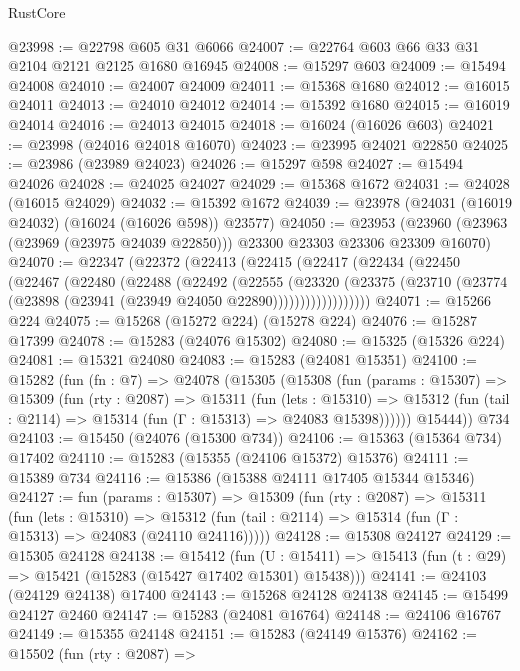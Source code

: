 \begin{lexlean}{RustCore}
\begin{coremodule}
@23998 := @22798 @605 @31 @6066
@24007 := @22764 @603 @66 @33 @31 @2104 @2121 @2125 @1680 @16945
@24008 := @15297 @603
@24009 := @15494 @24008
@24010 := @24007 @24009
@24011 := @15368 @1680
@24012 := @16015 @24011
@24013 := @24010 @24012
@24014 := @15392 @1680
@24015 := @16019 @24014
@24016 := @24013 @24015
@24018 := @16024 (@16026 @603)
@24021 := @23998 (@24016 @24018 @16070)
@24023 := @23995 @24021 @22850
@24025 := @23986 (@23989 @24023)
@24026 := @15297 @598
@24027 := @15494 @24026
@24028 := @24025 @24027
@24029 := @15368 @1672
@24031 := @24028 (@16015 @24029)
@24032 := @15392 @1672
@24039 := @23978 (@24031 (@16019 @24032) (@16024 (@16026 @598)) @23577)
@24050 := @23953
    (@23960 (@23963 (@23969 (@23975 @24039 @22850))) @23300 @23303 @23306 @23309 @16070)
@24070 := @22347
    (@22372
      (@22413
        (@22415
          (@22417
            (@22434
              (@22450
                (@22467
                  (@22480
                    (@22488
                      (@22492
                        (@22555
                          (@23320
                            (@23375
                              (@23710
                                (@23774 (@23898 (@23941 (@23949 @24050 @22890))))))))))))))))))
@24071 := @15266 @224
@24075 := @15268 (@15272 @224) (@15278 @224)
@24076 := @15287 @17399
@24078 := @15283 (@24076 @15302)
@24080 := @15325 (@15326 @224)
@24081 := @15321 @24080
@24083 := @15283 (@24081 @15351)
@24100 := @15282
    (fun (fn : @7) =>
    @24078
      (@15305
        (@15308
          (fun (params : @15307) =>
          @15309
            (fun (rty : @2087) =>
            @15311
              (fun (lets : @15310) =>
              @15312 (fun (tail : @2114) => @15314 (fun (Γ : @15313) => @24083 @15398))))))
        @15444))
    @734
@24103 := @15450 (@24076 (@15300 @734))
@24106 := @15363 (@15364 @734) @17402
@24110 := @15283 (@15355 (@24106 @15372) @15376)
@24111 := @15389 @734
@24116 := @15386 (@15388 @24111 @17405 @15344 @15346)
@24127 := fun (params : @15307) =>
  @15309
    (fun (rty : @2087) =>
    @15311
      (fun (lets : @15310) =>
      @15312 (fun (tail : @2114) => @15314 (fun (Γ : @15313) => @24083 (@24110 @24116)))))
@24128 := @15308 @24127
@24129 := @15305 @24128
@24138 := @15412
    (fun (U : @15411) => @15413 (fun (t : @29) => @15421 (@15283 (@15427 @17402 @15301) @15438)))
@24141 := @24103 (@24129 @24138) @17400
@24143 := @15268 @24128 @24138
@24145 := @15499 @24127 @2460
@24147 := @15283 (@24081 @16764)
@24148 := @24106 @16767
@24149 := @15355 @24148
@24151 := @15283 (@24149 @15376)
@24162 := @15502
    (fun (rty : @2087) =>

\end{coremodule}
\end{lexlean}
